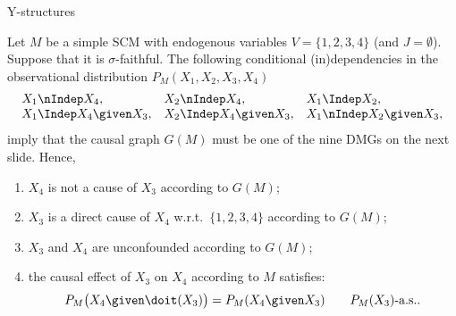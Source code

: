 \begin{frame}{Y-structures \cite{ManiPhD2006}}
\begin{Prp}[\ref{prp:y-structures}]
  Let $M$ be a simple SCM with endogenous variables $V = \{1,2,3,4\}$ (and $J = \emptyset$).
  Suppose that it is $\sigma$-faithful. 
  The following conditional (in)dependencies in the observational distribution $P_{M}(X_1,X_2,X_3,X_4)$
  $$\begin{array}{lll}
    X_1 \nIndep X_4,  & X_2 \nIndep X_4, & X_1 \Indep X_2, \\
    X_1 \Indep X_4 \given X_3, & X_2 \Indep X_4 \given X_3, & X_1 \nIndep X_2 \given X_3,
  \end{array}$$
  imply that the causal graph $G(M)$ must be one of the nine DMGs on the next slide.
  Hence,
  \begin{enumerate}
    \item $X_4$ is not a cause of $X_3$ according to $G(M)$;
    \item $X_3$ is a direct cause of $X_4$ w.r.t.\ $\{1,2,3,4\}$ according to $G(M)$;
    \item $X_3$ and $X_4$ are unconfounded according to $G(M)$;
    \item the causal effect of $X_3$ on $X_4$ according to $M$ satisfies:
  \begin{equation}\label{sl-eq:Y_causal_effect}
    P_{M}\big(X_4 \given \doit(X_3)\big) = P_{M}(X_4 \given X_3) \qquad P_M(X_3)\text{-a.s.}.
  \end{equation}
  \end{enumerate}
\end{Prp}
\end{frame}

